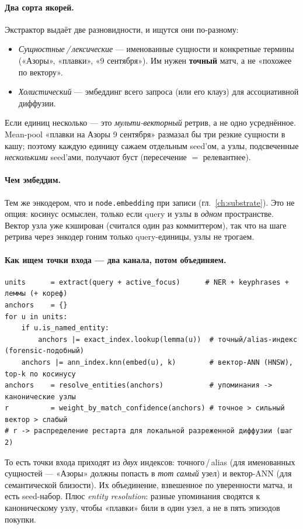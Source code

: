 \paragraph{Два сорта якорей.} Экстрактор выдаёт две разновидности, и ищутся они по-разному:
\begin{itemize}\itemsep2pt
\item \emph{Сущностные\,/\,лексические} — именованные сущности и конкретные термины
(«Азоры», «плавки», «9 сентября»). Им нужен \textbf{точный} матч, а не «похожее по вектору».
\item \emph{Холистический} — эмбеддинг всего запроса (или его клауз) для ассоциативной
диффузии.
\end{itemize}
Если единиц несколько — это \emph{мульти-векторный} ретрив, а не одно усреднённое. Mean-pool
«плавки на Азоры 9 сентября» размазал бы три резкие сущности в кашу; поэтому каждую единицу
сажаем отдельным seed'ом, а узлы, подсвеченные \emph{несколькими} seed'ами, получают буст
(пересечение $=$ релевантнее).

\paragraph{Чем эмбеддим.} Тем же энкодером, что и \texttt{node.embedding} при записи
(гл.~\ref{ch:substrate}). Это не опция: косинус осмыслен, только если query и узлы в
\emph{одном} пространстве. Вектор узла уже кэширован (считался один раз коммиттером), так
что на шаге ретрива через энкодер гоним только query-единицы, узлы не трогаем.

\paragraph{Как ищем точки входа — два канала, потом объединяем.}
\begin{lstlisting}[style=pseudo]
units      = extract(query + active_focus)      # NER + keyphrases + леммы (+ кореф)
anchors    = {}
for u in units:
    if u.is_named_entity:
        anchors |= exact_index.lookup(lemma(u))  # точный/alias-индекс (forensic-подобный)
    anchors |= ann_index.knn(embed(u), k)        # вектор-ANN (HNSW), top-k по косинусу
anchors    = resolve_entities(anchors)           # упоминания -> канонические узлы
r          = weight_by_match_confidence(anchors) # точное > сильный вектор > слабый
# r -> распределение рестарта для локальной разреженной диффузии (шаг 2)
\end{lstlisting}
То есть точки входа приходят из \emph{двух} индексов: точного\,/\,alias (для именованных
сущностей — «Азоры» должны попасть в \emph{тот самый} узел) и вектор-ANN (для семантической
близости). Их объединение, взвешенное по уверенности матча, и есть seed-набор. Плюс
\emph{entity resolution}: разные упоминания сводятся к каноническому узлу, чтобы «плавки»
били в один узел, а не в пять эпизодов покупки.

